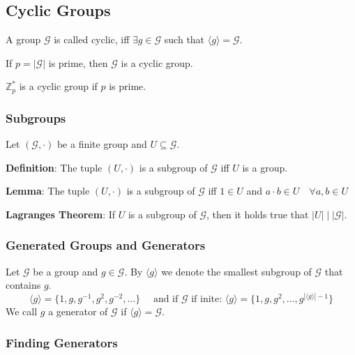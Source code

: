 \hypertarget{cyclic-groups}{%
\subsection{Cyclic Groups}\label{cyclic-groups}}

A group \(\mathcal{G}\) is called cyclic, iff
\(\exists g \in \mathcal{G}\) such that
\(\langle g\rangle = \mathcal{G}\).

If \(p = |\mathcal{G}|\) is prime, then \(\mathcal{G}\) is a cyclic
group.

\(\mathbb{Z}_p^*\) is a cyclic group if \(p\) is prime.

\hypertarget{subgroups}{%
\subsubsection{Subgroups}\label{subgroups}}

Let \((\mathcal{G}, \cdot)\) be a finite group and
\(U \subseteq \mathcal{G}\).

\textbf{Definition}: The tuple \((U, \cdot)\) is a subgroup of
\(\mathcal{G}\) iff \(U\) is a group.

\textbf{Lemma}: The tuple \((U, \cdot)\) is a subgroup of
\(\mathcal{G}\) iff \(1 \in U\) and
\(a \cdot b \in U \quad \forall a,b \in U\)

\textbf{Lagranges Theorem}: If \(U\) is a subgroup of \(\mathcal{G}\),
then it holds true that \(|U|\;|\;|\mathcal{G}|\).

\hypertarget{generated-groups-and-generators}{%
\subsubsection{Generated Groups and
Generators}\label{generated-groups-and-generators}}

Let \(\mathcal{G}\) be a group and \(g \in \mathcal{G}\). By
\(\langle g\rangle\) we denote the smallest subgroup of \(\mathcal{G}\)
that contains \(g\).
\[\langle g\rangle = \{1, g, g^{-1}, g^{2}, g^{-2}, \dots\}\quad
\text{ and if $\mathcal{G}$ if inite: }
\langle g\rangle = \{1, g, g^{2}, \dots, g^{|\langle g\rangle| - 1}\}\]
We call \(g\) a generator of \(\mathcal{G}\) if
\(\langle g\rangle = \mathcal{G}\).

\hypertarget{finding-generators}{%
\subsubsection{Finding Generators}\label{finding-generators}}

